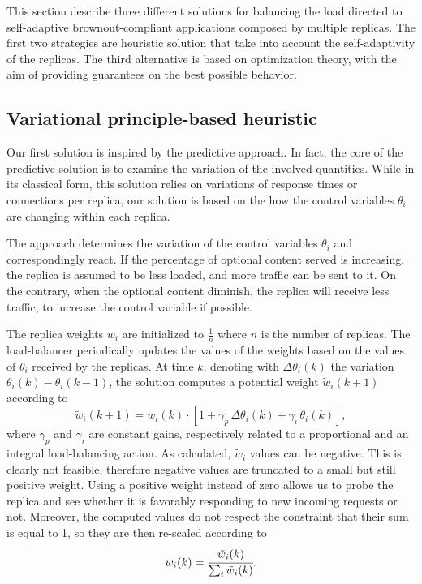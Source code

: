 This section describe three different solutions for balancing the load
directed to self-adaptive brownout-compliant applications composed by
multiple replicas. The first two strategies are heuristic solution
that take into account the self-adaptivity of the replicas. The third
alternative is based on optimization theory, with the aim of providing
guarantees on the best possible behavior.

\subsection{Variational principle-based heuristic}

Our first solution is inspired by the predictive approach. In fact,
the core of the predictive solution is to examine the variation of the
involved quantities. While in its classical form, this solution relies
on variations of response times or connections per replica, our
solution is based on the how the control variables $\theta_i$ are
changing within each replica.

The approach determines the variation of the control variables
$\theta_i$ and correspondingly react. If the percentage of optional
content served is increasing, the replica is assumed to be less
loaded, and more traffic can be sent to it. On the contrary, when the
optional content diminish, the replica will receive less traffic, to
increase the control variable if possible.

The replica weights $w_i$ are initialized to $\frac{1}{n}$ where $n$
is the number of replicas. The load-balancer periodically updates the
values of the weights based on the values of $\theta_i$ received by
the replicas. At time $k$, denoting with $\Delta \theta_i (k)$ the
variation $\theta_i (k) - \theta_i (k-1)$, the solution computes a
potential weight $\tilde{w}_i(k+1)$ according to
\begin{equation}
  \tilde{w}_i(k+1) = w_i(k) \cdot 
\left[ 1 + \gamma_p \, \Delta \theta_i (k) + \gamma_i \, \theta_i (k) \right] ,
\label{eq:theta-diff}
\end{equation}
where $\gamma_p$ and $\gamma_i$ are constant gains, respectively
related to a proportional and an integral load-balancing action. As
calculated, $\tilde{w}_i$ values can be negative. This is clearly not
feasible, therefore negative values are truncated to a small but still
positive weight. Using a positive weight instead of zero allows us to
probe the replica and see whether it is favorably responding to new
incoming requests or not. Moreover, the computed values do not respect
the constraint that their sum is equal to 1, so they are then
re-scaled according to
\begin{equation}
  w_i (k) = \cfrac{\tilde{w}_i (k)}{\sum_i \tilde{w}_i (k)}.
\label{eq:theta-diff-rescale}
\end{equation}


